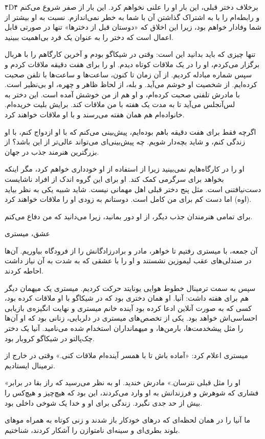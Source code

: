۴D۴ برخلاف دختر قبلی، این بار او را علنی نخواهم کرد. این بار از صفر شروع می‌کنم و رابطه‌ام را با به اشتراک گذاشتن آن با شما به خطر نمی‌اندازم. نسبت به او بیشتر از شما وفادار خواهم بود، زیرا این اخلاق که «دوستان قبل از دخترها» تنها در صورتی قابل اعمال است که دختر را به عنوان یک فرد بی‌اهمیت ببینید. 

تنها چیزی که باید بدانید این است: وقتی در شیکاگو بودم و آخرین کارگاهم را با هربال برگزار می‌کردم، او را در یک ملاقات کوتاه دیدم. او را برای هفت دقیقه ملاقات کردم و سپس شماره مبادله کردیم. از آن زمان تا کنون، ساعت‌ها و ساعت‌ها با تلفن صحبت کرده‌ایم. از شخصیت او خوشم می‌آید. و بله، از لحاظ ظاهر و چهره، او بی‌نظیر است. با مادرش تلفنی صحبت کرده‌ام، و او هم از من خوشش آمده است. این دختر به لس‌آنجلس می‌آید تا به مدت یک هفته با من ملاقات کند. برایش بلیت خریده‌ام. خانواده‌ام هم همان هفته می‌رسند و با او ملاقات خواهند کرد.

اگرچه فقط برای هفت دقیقه باهم بوده‌ایم، پیش‌بینی می‌کنم که با او ازدواج کنم، با او زندگی کنم، و شاید بچه‌دار شویم. چه پیش‌بینی‌ای می‌تواند عالی‌تر از این باشد؟ از بزرگترین هنرمند جذب در جهان. 

او را در کارگاه‌هایم نمی‌بینید زیرا از استفاده از او خودداری خواهم کرد، مگر اینکه بخواهد برای سرگرمی کمک کند. او برای این گروه اندک از افراد ناشایست دست‌نیافتنی است. مثل پنج دختر قبلی اهل مهمانی نیست. شاید شبیه یکی به نظر بیاید (اوه) اما دست کم برای من کامل است. دوستانم به زودی او را ملاقات خواهند کرد.

برای تمامی هنرمندان جذب دیگر، از او دور بمانید، زیرا می‌دانید که من دفاع می‌کنم.

عشق، 
میستری

آن جمعه، با میستری رفتیم تا خواهر، مادر و برادرزادگانش را از فرودگاه بیاوریم. آن‌ها در صندلی‌های عقب لیموزین نشستند و او را با عشقی که به شدت به آن نیاز داشت احاطه کردند.

سپس به سمت ترمینال خطوط هوایی یونایتد حرکت کردیم. میستری یک میهمان دیگر هم برای هفته داشت: آنیا. او همان دختری بود که در شیکاگو با او ملاقات کرده بود، کسی که به صورت آنلاین ادعا کرده بود آینده خانم میستری و نهایت انگیزه‌ی بازیابی احساسی‌اش خواهد بود. یکی از تخصص‌های میستری در دلربایی، زنانی بود که او آن‌ها را مثل پیشخدمت‌ها، بارمن‌ها، و میهمانداران استخدام شده می‌نامید. آنیا یک دختر چک‌پالتو در شیکاگو کروبار بود. 

میستری اعلام کرد: «آماده باش تا با همسر آینده‌ام ملاقات کنی.» وقتی در خارج از ترمینال ایستادیم.

«او را مثل قبلی نترسان.» مادرش خندید. او به نظر می‌رسید که راز بقا در برابر فشاری که شوهرش و فرزندانش به او وارد می‌کردند، این بود که هیچ‌چیز و هیچ‌کس را بیش از حد جدی نگیرد. زندگی برای او و خدا یک شوخی داخلی بود.

ما آنیا را در همان لحظه‌ای که درهای خودکار باز شدند و زنی کوتاه به همراه موهای بلوند بطری‌ای و سینه‌ای نامتوازن را آشکار کردند، شناختیم.